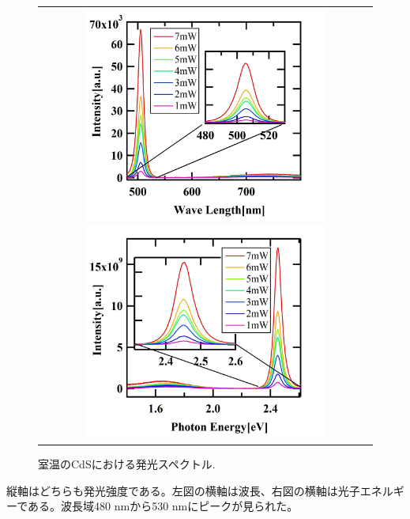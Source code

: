 \documentclass[11pt,a4j]{jsarticle}
\begin{document}
\begin{figure}[ht]
 \centering
 \begin{tabular}{c}

  \begin{minipage}{0.5\hsize}

   \includegraphics[clip,width=8cm]{start2_CdS_rt_Spectrum_wav.jpg}
  \end{minipage}

  \begin{minipage}{0.5\hsize}
   \centering
   \includegraphics[clip,width=8cm]{start2_CdS_rt_Spectrum_eV.jpg}
  \end{minipage}
 \end{tabular}
 \caption{室温のCdSにおける発光スペクトル.}
 \label{fig_cds_rt_spec1}

\end{figure}

縦軸はどちらも発光強度である。左図の横軸は波長、右図の横軸は光子エネルギーである。波長域480 nmから530 nmにピークが見られた。
%
\end{document}
